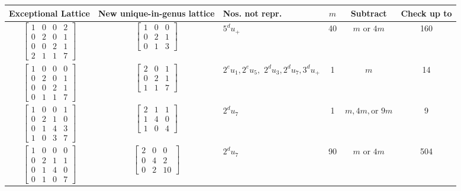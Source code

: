 {\begin{table}[ht]
    \centering
    \begin{tabular}{|c|c|p{1in}|c|c|c|}
    \hline
    Exceptional Lattice & New unique-in-genus lattice & Nos. not repr. & $m$ & Subtract & Check up to \\
    \hline
    $\begin{bmatrix} 1 & 0 & 0 & 2 \\ 0 & 2 & 0 & 1 \\ 0 & 0 & 2 & 1 \\ 2 & 1 & 1 & 7 \end{bmatrix}$ & $\begin{bmatrix} 1 & 0 & 0 \\ 0 & 2 & 1 \\ 0 & 1 & 3 \end{bmatrix}$ & $5^d u_+$ & 40 & $m$ or $4m$ & 160 \\
    \hline
    $\begin{bmatrix} 1 & 0 & 0 & 0 \\ 0 & 2 & 0 & 1 \\ 0 & 0 & 2 & 1 \\ 0 & 1 & 1 & 7 \end{bmatrix}$ & $\begin{bmatrix} 2 & 0 & 1 \\ 0 & 2 & 1 \\ 1 & 1 & 7 \end{bmatrix}$ & $2^e u_1, 2^e u_5,$ \newline $2^d u_3, 2^d u_7, 3^d u_+$ & 1 & $m$ & 14 \\ \hline
    $\begin{bmatrix} 1 & 0 & 0 & 1 \\ 0 & 2 & 1 & 0 \\ 0 & 1 & 4 & 3 \\ 1 & 0 & 3 & 7 \end{bmatrix}$ & $\begin{bmatrix} 2 & 1 & 1 \\ 1 & 4 & 0 \\ 1 & 0 & 4 \end{bmatrix}$ & $2^d u_7$ & 1 & $m, 4m, \text{or } 9m$ & 9 \\
    \hline
    $\begin{bmatrix} 1 & 0 & 0 & 0 \\ 0 & 2 & 1 & 1 \\ 0 & 1 & 4 & 0 \\ 0 & 1 & 0 & 7 \end{bmatrix}$ \footnotemark & $\begin{bmatrix} 2 & 0 & 0 \\ 0 & 4 & 2 \\ 0 & 2 & 10 \end{bmatrix}$ & $2^d u_7$ & 90 & $m \text{ or } 4m$ & 504 \\

\end{tabular}
\end{table}}
